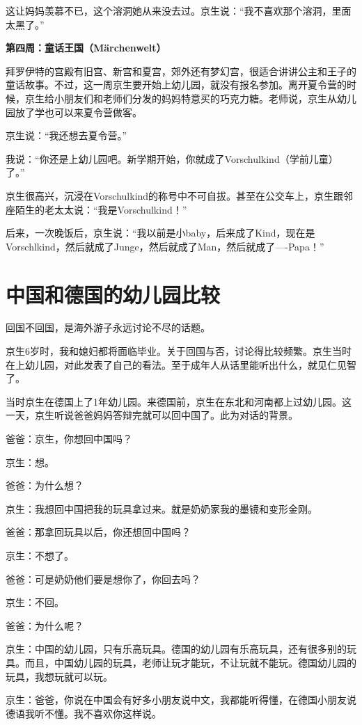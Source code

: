 \documentclass[twoside,openright,headings=optiontohead]{ctexbook} %
\begin{document}
{这让妈妈羡慕不已，这个溶洞她从来没去过。京生说：``我不喜欢那个溶洞，里面太黑了。''

\textbf{第四周：童话王国（Märchenwelt）}

拜罗伊特的宫殿有旧宫、新宫和夏宫，郊外还有梦幻宫，很适合讲讲公主和王子的童话故事。不过，这一周京生要开始上幼儿园，就没有报名参加。离开夏令营的时候，京生给小朋友们和老师们分发的妈妈特意买的巧克力糖。老师说，京生从幼儿园放了学也可以来夏令营做客。

京生说：``我还想去夏令营。''

我说：``你还是上幼儿园吧。新学期开始，你就成了Vorschulkind（学前儿童）了。''

京生很高兴，沉浸在Vorschulkind的称号中不可自拔。甚至在公交车上，京生跟邻座陌生的老太太说：``我是Vorschulkind！''

后来，一次晚饭后，京生说：``我以前是小baby，后来成了Kind，现在是Vorschlkind，然后就成了Junge，然后就成了Man，然后就成了----Papa！''

\chapter*{中国和德国的幼儿园比较}\label{kindergarten-compare}

回国不回国，是海外游子永远讨论不尽的话题。

京生6岁时，我和媳妇都将面临毕业。关于回国与否，讨论得比较频繁。京生当时在上幼儿园，对此发表了自己的看法。至于成年人从话里能听出什么，就见仁见智了。

当时京生在德国上了1年幼儿园。来德国前，京生在东北和河南都上过幼儿园。这一天，京生听说爸爸妈妈答辩完就可以回中国了。此为对话的背景。

爸爸：京生，你想回中国吗？

京生：想。

爸爸：为什么想？

京生：我想回中国把我的玩具拿过来。就是奶奶家我的墨镜和变形金刚。

爸爸：那拿回玩具以后，你还想回中国吗？

京生：不想了。

爸爸：可是奶奶他们要是想你了，你回去吗？

京生：不回。

爸爸：为什么呢？

京生：中国的幼儿园，只有乐高玩具。德国的幼儿园有乐高玩具，还有很多别的玩具。而且，中国幼儿园的玩具，老师让玩才能玩，不让玩就不能玩。德国幼儿园的玩具，我想玩就可以玩。

京生：爸爸，你说在中国会有好多小朋友说中文，我都能听得懂，在德国小朋友说德语我听不懂。我不喜欢你这样说。

}
\end{document}
